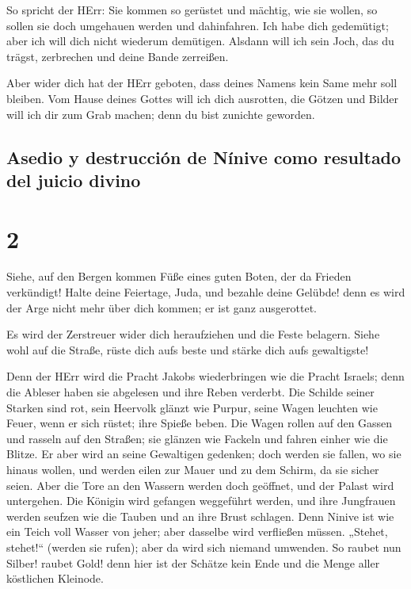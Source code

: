  So spricht der HErr: Sie kommen so gerüstet und mächtig,
wie sie wollen, so sollen sie doch umgehauen werden und dahinfahren. Ich
habe dich gedemütigt; aber ich will dich nicht wiederum demütigen.
 Alsdann will ich sein Joch, das du trägst, zerbrechen
und deine Bande zerreißen.

 Aber wider dich hat der HErr geboten, dass deines Namens
kein Same mehr soll bleiben. Vom Hause deines Gottes will ich dich
ausrotten, die Götzen und Bilder will ich dir zum Grab machen; denn du
bist zunichte geworden.

\hypertarget{asedio-y-destrucciuxf3n-de-nuxednive-como-resultado-del-juicio-divino}{%
\subsection{Asedio y destrucción de Nínive como resultado del juicio
divino}\label{asedio-y-destrucciuxf3n-de-nuxednive-como-resultado-del-juicio-divino}}

\hypertarget{section-1}{%
\section{2}\label{section-1}}

 Siehe, auf den Bergen kommen Füße eines guten Boten, der
da Frieden verkündigt! Halte deine Feiertage, Juda, und bezahle deine
Gelübde! denn es wird der Arge nicht mehr über dich kommen; er ist ganz
ausgerottet.

 Es wird der Zerstreuer wider dich heraufziehen und die
Feste belagern. Siehe wohl auf die Straße, rüste dich aufs beste und
stärke dich aufs gewaltigste!

 Denn der HErr wird die Pracht Jakobs wiederbringen wie
die Pracht Israels; denn die Ableser haben sie abgelesen und ihre Reben
verderbt.  Die Schilde seiner Starken sind rot, sein
Heervolk glänzt wie Purpur, seine Wagen leuchten wie Feuer, wenn er sich
rüstet; ihre Spieße beben.  Die Wagen rollen auf den
Gassen und rasseln auf den Straßen; sie glänzen wie Fackeln und fahren
einher wie die Blitze.  Er aber wird an seine Gewaltigen
gedenken; doch werden sie fallen, wo sie hinaus wollen, und werden eilen
zur Mauer und zu dem Schirm, da sie sicher seien.  Aber
die Tore an den Wassern werden doch geöffnet, und der Palast wird
untergehen.  Die Königin wird gefangen weggeführt werden,
und ihre Jungfrauen werden seufzen wie die Tauben und an ihre Brust
schlagen.  Denn Ninive ist wie ein Teich voll Wasser von
jeher; aber dasselbe wird verfließen müssen. „Stehet, stehet!{}``
(werden sie rufen); aber da wird sich niemand umwenden. 
So raubet nun Silber! raubet Gold! denn hier ist der Schätze kein Ende
und die Menge aller köstlichen Kleinode.

